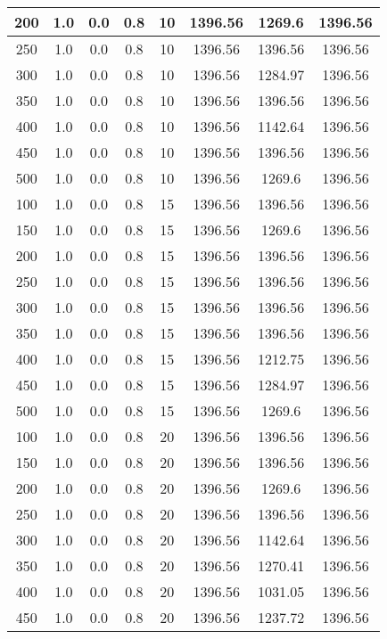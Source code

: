 \documentclass[a4paper, 12pt]{extreport}
\begin{document}
\begin{itemize}
\begin{longtable}{|c|c|c|c|c|c|c|c|}
			200 & 1.0 & 0.0 & 0.8 & 10 & 1396.56 & 1269.6 & 1396.56 \\\hline
			250 & 1.0 & 0.0 & 0.8 & 10 & 1396.56 & 1396.56 & 1396.56 \\\hline
			300 & 1.0 & 0.0 & 0.8 & 10 & 1396.56 & 1284.97 & 1396.56 \\\hline
			350 & 1.0 & 0.0 & 0.8 & 10 & 1396.56 & 1396.56 & 1396.56 \\\hline
			400 & 1.0 & 0.0 & 0.8 & 10 & 1396.56 & 1142.64 & 1396.56 \\\hline
			450 & 1.0 & 0.0 & 0.8 & 10 & 1396.56 & 1396.56 & 1396.56 \\\hline
			500 & 1.0 & 0.0 & 0.8 & 10 & 1396.56 & 1269.6 & 1396.56 \\\hline
			100 & 1.0 & 0.0 & 0.8 & 15 & 1396.56 & 1396.56 & 1396.56 \\\hline
			150 & 1.0 & 0.0 & 0.8 & 15 & 1396.56 & 1269.6 & 1396.56 \\\hline
			200 & 1.0 & 0.0 & 0.8 & 15 & 1396.56 & 1396.56 & 1396.56 \\\hline
			250 & 1.0 & 0.0 & 0.8 & 15 & 1396.56 & 1396.56 & 1396.56 \\\hline
			300 & 1.0 & 0.0 & 0.8 & 15 & 1396.56 & 1396.56 & 1396.56 \\\hline
			350 & 1.0 & 0.0 & 0.8 & 15 & 1396.56 & 1396.56 & 1396.56 \\\hline
			400 & 1.0 & 0.0 & 0.8 & 15 & 1396.56 & 1212.75 & 1396.56 \\\hline
			450 & 1.0 & 0.0 & 0.8 & 15 & 1396.56 & 1284.97 & 1396.56 \\\hline
			500 & 1.0 & 0.0 & 0.8 & 15 & 1396.56 & 1269.6 & 1396.56 \\\hline
			100 & 1.0 & 0.0 & 0.8 & 20 & 1396.56 & 1396.56 & 1396.56 \\\hline
			150 & 1.0 & 0.0 & 0.8 & 20 & 1396.56 & 1396.56 & 1396.56 \\\hline
			200 & 1.0 & 0.0 & 0.8 & 20 & 1396.56 & 1269.6 & 1396.56 \\\hline
			250 & 1.0 & 0.0 & 0.8 & 20 & 1396.56 & 1396.56 & 1396.56 \\\hline
			300 & 1.0 & 0.0 & 0.8 & 20 & 1396.56 & 1142.64 & 1396.56 \\\hline
			350 & 1.0 & 0.0 & 0.8 & 20 & 1396.56 & 1270.41 & 1396.56 \\\hline
			400 & 1.0 & 0.0 & 0.8 & 20 & 1396.56 & 1031.05 & 1396.56 \\\hline
			450 & 1.0 & 0.0 & 0.8 & 20 & 1396.56 & 1237.72 & 1396.56 \\\hline

\end{longtable}
\end{itemize}
\end{document}
